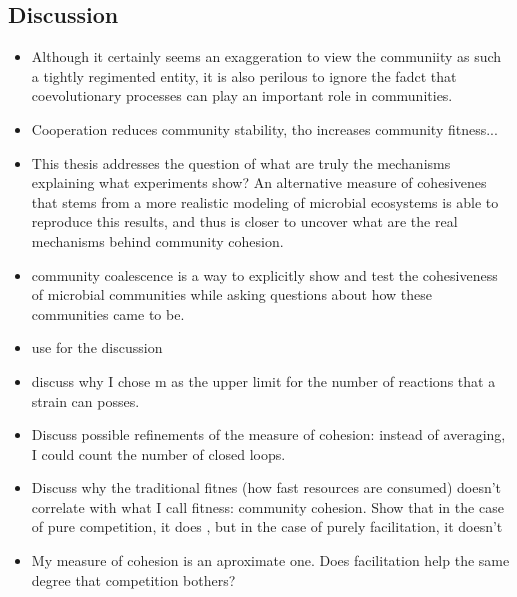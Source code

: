 \documentclass[titlepage,11pt]{article}
\begin{document}
\begin{linenumbers}
			
			\section{Discussion}
				\begin{itemize}
					\item  Although it certainly seems an exaggeration to view the communiity as such a tightly regimented entity, it is also perilous to ignore the fadct that coevolutionary processes can play an important role in communities.
					\item Cooperation reduces community stability, tho increases community fitness...  \citep{Coyte2015}
					\item This thesis addresses the question of what are truly the mechanisms explaining what experiments show? An alternative measure of cohesivenes that stems from a more realistic modeling of microbial ecosystems is able to reproduce this results, and thus is closer to uncover what are the real mechanisms behind community cohesion.
					\item community coalescence is a way to explicitly show and test the cohesiveness of microbial communities while asking questions about how these communities came to be.
					\item use \citet{Pascual-Garcia2020} for the discussion
					\item discuss why I chose m as the upper limit for the number of reactions that a strain can posses.
					\item  Discuss possible refinements of the measure of cohesion: instead of averaging, I could count the number of closed loops.
					\item Discuss why the traditional fitnes (how fast resources are consumed) doesn't correlate with what I call fitness: community cohesion. Show that in the case of pure competition, it does \citep{Tikhonov2016}, but in the case of purely facilitation, it doesn't
					\item  My measure of cohesion is an aproximate one. Does facilitation help the same degree that competition bothers?
				\end{itemize}

\end{linenumbers}
\end{document}
